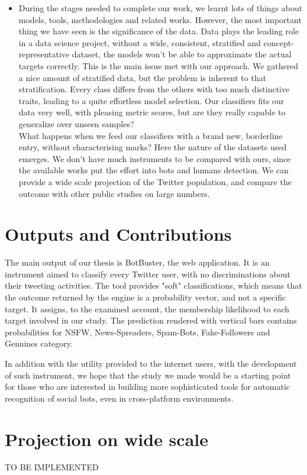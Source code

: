 \begin{itemize}
\item[\PencilRight] During the stages needed to complete our work, we learnt lots of things about models, tools, methodologies and related works. However, the most important thing we have seen is the significance of the data. Data plays the leading role in a data science project, without a wide, consistent, stratified and concept-representative dataset, the models won't be able to approximate the actual targets correctly. This is the main issue met with our approach.
We gathered a nice amount of stratified data, but the problem is inherent to that stratification. Every class differs from the others with too much distinctive traits, leading to a quite effortless model selection. Our classifiers fits our data very well, with pleasing metric scores, but are they really capable to generalize over unseen samples?\\
What happens when we feed our classifiers with a brand new, borderline entry, without characterising marks? Here the nature of the datasets used emerges. We don't have much instruments to be compared with ours, since the available works put the effort into bots and humans detection. We can provide a wide scale projection of the Twitter population, and compare the outcome with other public studies on large numbers.
\end{itemize}


\section{Outputs and Contributions}
The main output of our thesis is BotBuster, the web application. It is an instrument aimed to classify every Twitter user, with no discriminations about their tweeting activities. The tool provides "soft" classifications, which means that the outcome returned by the engine is a probability vector, and not a specific target. It assigns, to the examined account, the membership likelihood to each target involved in our study.
The prediction rendered with vertical bars contains probabilities for NSFW, News-Spreaders, Spam-Bots, Fake-Followers and Genuines category.

In addition with the utility provided to the internet users, with the development of such instrument, we hope that the study we made would be a starting point for those who are interested in building more sophisticated tools for automatic recognition of social bots, even in cross-platform environments.

\section{Projection on wide scale}
TO BE IMPLEMENTED


